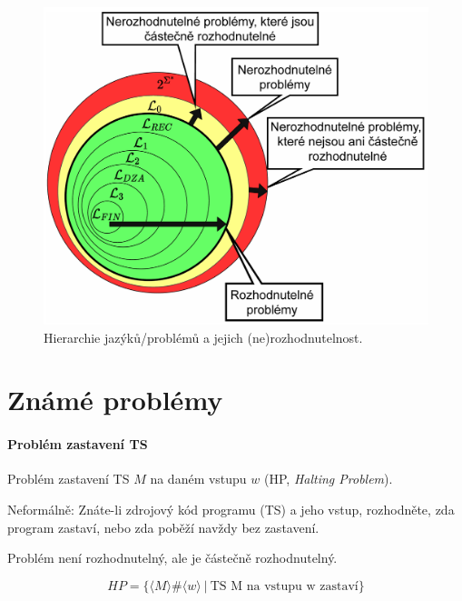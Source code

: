 
\begin{figure}[H]
    \centering
    \includegraphics[width=0.9\linewidth]{fj_hierarchy.pdf}
    \caption{Hierarchie jazýků/problémů a jejich (ne)rozhodnutelnost.}
\end{figure}


\section{Známé problémy}

\paragraph*{Problém zastavení TS} \begin{compactitem}
    \item Problém zastavení TS $M$ na daném vstupu $w$ (HP, \textit{Halting Problem}).

    \item Neformálně: Znáte-li zdrojový kód programu (TS) a jeho vstup, rozhodněte, zda program zastaví, nebo zda poběží navždy bez zastavení.

    \item Problém není rozhodnutelný, ale je částečně rozhodnutelný.
\end{compactitem}

$$ HP = \{ \langle M \rangle \# \langle w \rangle ~|~ \text{TS M na vstupu w zastaví} \} $$

